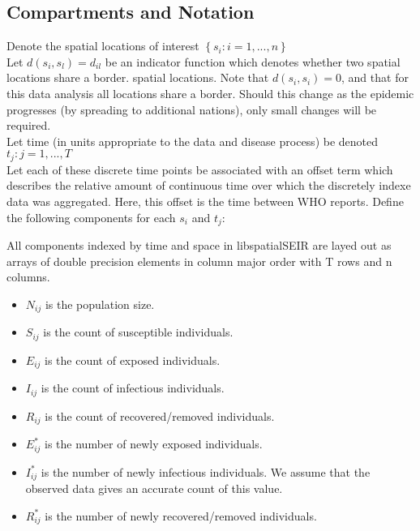 \documentclass[12pt]{article}
\newcommand \itx {\indent \indent \indent}
\newcommand \mbreak {\\ \vspace{0.1in}}
\begin{document}
    \subsection{Compartments and Notation}
    {
        \itx
        Denote the spatial locations of interest $\left\{s_i : i = 1, ...,n \right\}$ \\
        Let $d(s_i, s_l) = d_{il}$ be an indicator function which denotes whether two spatial locations share a border.  
        spatial locations. Note that $d(s_i, s_i) = 0$, and that for this data analysis all locations share a border. Should
        this change as the epidemic progresses (by spreading to additional nations), only small changes will be required. \\
         
        Let time (in units appropriate to the data and disease process) be denoted ${t_j : j = 1, ...,T}$ \\
        Let each of these discrete time points be associated with an offset term which describes the relative amount of 
        continuous time over which the discretely indexe data was aggregated. Here, this offset is the time between WHO reports. 
        Define the following components for each $s_i$ and $t_j$: \mbreak

        All components indexed by time and space in libspatialSEIR are layed out as arrays of double precision elements
        in column major order with T rows and n columns. 
    }
        \begin{itemize}
            \item {${N_{ij}}$} is the population size.
            \item {${S_{ij}}$} is the count of susceptible individuals.
            \item {${E_{ij}}$} is the count of exposed individuals.
            \item {${I_{ij}}$} is the count of infectious individuals. 
            \item {${R_{ij}}$} is the count of recovered/removed individuals.
            \item {${E^*_{ij}}$} is the number of newly exposed individuals.
            \item {${I^*_{ij}}$} is the number of newly infectious individuals. We assume that the observed data gives an accurate count of this value. 
            \item {${R^*_{ij}}$} is the number of newly recovered/removed individuals.
        \end{itemize}
        
\end{document}
